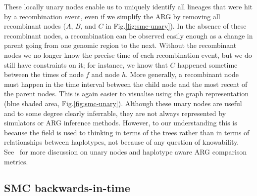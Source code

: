\documentclass{article}
\newcommand{\tsinfer}[0]{\texttt{tsinfer}}
\newcommand{\kwarg}[0]{\texttt{KwARG}}
\newcommand{\argweaver}[0]{\texttt{ARGweaver}}
\begin{document}
These locally unary nodes enable
us to uniquely identify all lineages that were hit by a recombination event, 
even if we simplify
the ARG by removing all recombinant nodes
($A$, $B$, and $C$ in Fig.\ref{fig:smc-unary}).
In the absence of these recombinant nodes, a recombination can be observed
easily enough as a change in parent going from one genomic region to the next.
Without the recombinant nodes we no longer know the precise time of each recombination event,
but we do still have constraints on it;
for instance, we know that $C$ happened sometime between the
times of node $f$ and node $h$. 
More generally, a recombinant node must happen in the time interval between the child node
and the most recent of the parent nodes.
This is again easier to visualise using the
graph representation (blue shaded area, Fig.\ref{fig:smc-unary}).
Although these unary nodes are useful and to some degree clearly inferrable,
they are not always represented by simulators or ARG inference methods.
However, to our understanding this is because
the field is used to thinking in terms of the trees
rather than in terms of relationships between haplotypes,
not because of any question of knowability.
See~\cite{fritze2024forest} for more discussion on unary nodes
and haplotype aware ARG comparison metrics.

\subsection*{SMC backwards-in-time}\label{par:description}
\end{document}
